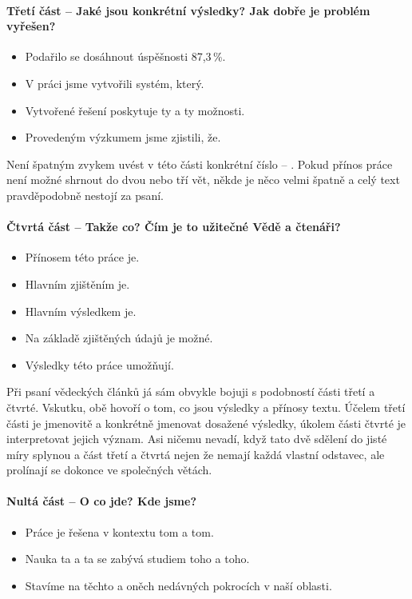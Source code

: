 \paragraph{Třetí část -- Jaké jsou konkrétní výsledky? Jak dobře je problém vyřešen?}
\begin{itemize}
  \item{Podařilo se dosáhnout úspěšnosti 87,3\,\%.}
  \item{V práci jsme vytvořili systém, který.}
  \item{Vytvořené řešení poskytuje ty a ty možnosti.}
  \item{Provedeným výzkumem jsme zjistili, že.}
\end{itemize}

Není špatným zvykem uvést v této části konkrétní číslo -- . Pokud přínos práce není možné shrnout do dvou nebo tří vět, někde je něco velmi špatně a celý text pravděpodobně nestojí za psaní.

\paragraph{Čtvrtá část -- Takže co? Čím je to užitečné Vědě a čtenáři?}
\begin{itemize}
  \item{Přínosem této práce je.}
  \item{Hlavním zjištěním je.}
  \item{Hlavním výsledkem je.}
  \item{Na základě zjištěných údajů je možné.}
  \item{Výsledky této práce umožňují.}
\end{itemize}

Při psaní vědeckých článků já sám obvykle bojuji s podobností části třetí a čtvrté. Vskutku, obě hovoří o tom, co jsou výsledky a přínosy textu. Účelem třetí části je jmenovitě a konkrétně jmenovat dosažené výsledky, úkolem části čtvrté je interpretovat jejich význam. Asi ničemu nevadí, když tato dvě sdělení do jisté míry splynou a část třetí a čtvrtá nejen že nemají každá vlastní odstavec, ale prolínají se dokonce ve společných větách.

\paragraph{Nultá část -- O co jde? Kde jsme?}
\begin{itemize}
  \item{Práce je řešena v kontextu tom a tom.}
  \item{Nauka ta a ta se zabývá studiem toho a toho.}
  \item{Stavíme na těchto a oněch nedávných pokrocích v naší oblasti.}
\end{itemize}

